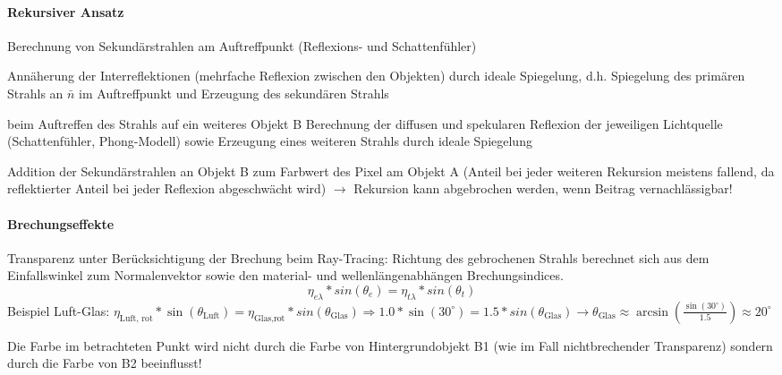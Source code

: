 \documentclass[landscape]{article}
\begin{document}
\begin{multicols}{3}
  
  \paragraph{Rekursiver Ansatz}
  \begin{itemize*}
    \item Berechnung von Sekundärstrahlen am Auftreffpunkt (Reflexions- und Schattenfühler)
    \item Annäherung der Interreflektionen (mehrfache Reflexion zwischen den Objekten) durch ideale Spiegelung, d.h. Spiegelung des primären Strahls an $\bar{n}$ im Auftreffpunkt und Erzeugung des sekundären Strahls
    \item beim Auftreffen des Strahls auf ein weiteres Objekt B Berechnung der diffusen und spekularen Reflexion der jeweiligen Lichtquelle (Schattenfühler, Phong-Modell) sowie Erzeugung eines weiteren Strahls durch ideale Spiegelung
    \item Addition der Sekundärstrahlen an Objekt B zum Farbwert des Pixel am Objekt A (Anteil bei jeder weiteren Rekursion meistens fallend, da reflektierter Anteil bei jeder Reflexion abgeschwächt wird) $\rightarrow$ Rekursion kann abgebrochen werden, wenn Beitrag vernachlässigbar!
  \end{itemize*}
  
  
  \paragraph{Brechungseffekte}
  Transparenz unter Berücksichtigung der Brechung beim Ray-Tracing: Richtung des gebrochenen Strahls berechnet sich aus dem Einfallswinkel zum Normalenvektor sowie den material- und wellenlängenabhängen Brechungsindices.
  $$\eta_{e\lambda}*sin(\theta_e) = \eta_{t\lambda}*sin(\theta_t)$$
  Beispiel Luft-Glas: $\eta_{\text{Luft, rot}}*\sin(\theta_{\text{Luft}})=\eta_{\text{Glas,rot}}*sin(\theta_{\text{Glas}}) \Rightarrow 1.0*\sin(30^\circ)=1.5*sin(\theta_{\text{Glas}})\rightarrow \theta_{\text{Glas}} \approx \arcsin(\frac{\sin(30^\circ)}{1.5})\approx 20^\circ$
  
  Die Farbe im betrachteten Punkt wird nicht durch die Farbe von Hintergrundobjekt B1 (wie im Fall nichtbrechender Transparenz) sondern durch die Farbe von B2 beeinflusst!
  

\end{multicols}
\end{document}
